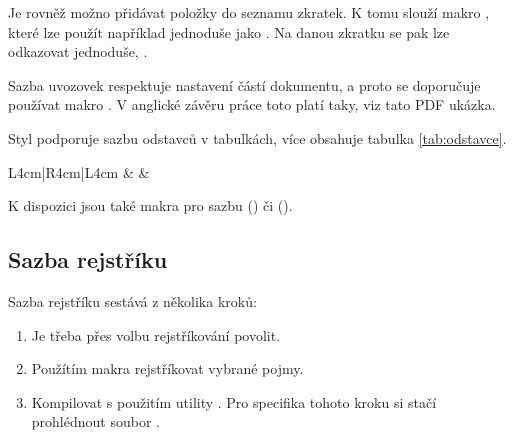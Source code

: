 \documentclass[
  biblatex,
  glossaries,
  index
]{kidiplom}
\begin{document}
Je rovněž možno přidávat položky do seznamu zkratek. K tomu slouží makro , které lze použít například jednoduše jako . Na danou zkratku se pak lze odkazovat jednoduše, .

Sazba uvozovek respektuje nastavení částí dokumentu, a proto se doporučuje používat makro . V anglické závěru práce toto platí taky, viz tato PDF ukázka.

Styl podporuje sazbu odstavců v tabulkách, více obsahuje tabulka \ref{tab:odstavce}.

\begin{table}
  \begin{center}
    \caption{Seznam přepínačů}\label{tab:odstavce}
    \begin{tabular}{L{4cm}|R{4cm}|L{4cm}}
      \lipsum[23] & \lipsum[22] & \lipsum[21]
    \end{tabular}
  \end{center}
\end{table}

K dispozici jsou také makra pro sazbu \csharp{} () či \cpp{} ().


\subsection{Sazba rejstříku}
Sazba rejstříku sestává z několika kroků:

\begin{enumerate}
  \item Je třeba přes volbu  rejstříkování povolit.
  \item Použítím makra  rejstříkovat vybrané pojmy.
  \item Kompilovat s použitím utility . Pro specifika tohoto kroku si stačí prohlédnout soubor .
\end{enumerate}
\end{document}
